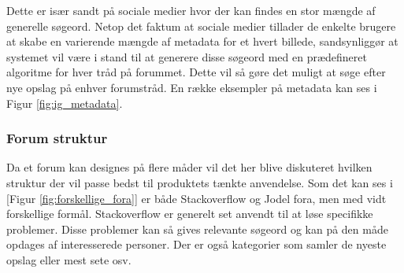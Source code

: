 Dette er især sandt på sociale medier hvor der kan findes en stor mængde af generelle søgeord. Netop det faktum at sociale medier tillader de enkelte brugere at skabe en varierende mængde af metadata for et hvert billede, sandsynliggør at systemet vil være i stand til at generere disse søgeord med en prædefineret algoritme for hver tråd på forummet. Dette vil så gøre det muligt at søge efter nye opslag på enhver forumstråd. En række eksempler på metadata kan ses i Figur \ref{fig:ig_metadata}.

\subsubsection{Forum struktur}
\label{forum_struktur}
Da et forum kan designes på flere måder vil det her blive diskuteret hvilken struktur der vil passe bedst til produktets tænkte anvendelse. Som det kan ses i [Figur \ref{fig:forskellige_fora}] er både Stackoverflow og Jodel fora, men med vidt forskellige formål. Stackoverflow er generelt set anvendt til at løse specifikke problemer. Disse problemer kan så gives relevante søgeord og kan på den måde opdages af interesserede personer. Der er også kategorier som samler de nyeste opslag eller mest sete osv.

